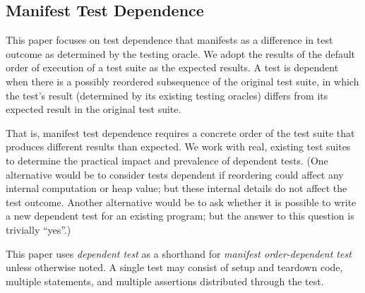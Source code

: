 
\subsection{Manifest Test Dependence}

This paper focuses on test
dependence that manifests as a
difference in test outcome as determined by the testing oracle.
We adopt the results of the default
order of execution of a test suite as the
expected results. A test is dependent when there is a possibly
reordered subsequence of the original test suite, in which
the test's result (determined by its existing testing
oracles) differs from its expected result in the
original test suite.

That is, manifest test dependence
requires a concrete order of the test suite that
produces {different} results than expected.  
%
We work with real, existing test suites to determine the practical impact
and prevalence of dependent tests.
%
(One alternative would be to consider tests dependent if reordering could
affect any internal computation or heap value; but these internal details
do not affect the test outcome.  Another alternative would be to ask
whether it is possible to write a new dependent test for an existing
program; but the answer to this question is trivially ``yes''.)


This paper uses \textit{dependent test} as a shorthand for
\textit{manifest order-dependent test}
unless otherwise noted.
%
A single test may consist of setup and teardown
code, multiple statements, and multiple assertions
distributed
through the test.






